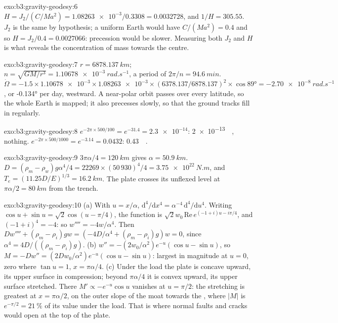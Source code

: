 \begin{solution}{exo:b3:gravity-geodesy:6}
$H = J_2/(C/Ma^2) = \num{1.08263e-3}/0.3308 = \num{0.0032728}$, and
$1/H = 305.55$. $J_2$ is the same by hypothesis; a uniform Earth would have
$C/(Ma^2) = 0.4$ and so $H = J_2/0.4 = \num{0.0027066}$: precession would be
slower. Measuring both $J_2$ and $H$ is what reveals the concentration of mass
towards the centre.
\end{solution}

\begin{solution}{exo:b3:gravity-geodesy:7}
$r = \qty{6878.137}{km}$; $n = \sqrt{GM/r^3} = \qty{1.10678e-3}{rad.s^{-1}}$, a
period of $2\pi/n = \qty{94.6}{min}$. $\dot\Omega = -1.5\times\num{1.10678e-3}
\times\num{1.08263e-3}\times(6378.137/6878.137)^2\times\cos\ang{89} =
\qty{-2.70e-8}{rad.s^{-1}}$, or \ang{-0.134} per day, westward. A near-polar orbit
passes over every latitude, so the whole Earth is mapped; it also precesses
slowly, so that the ground tracks fill in regularly.
\end{solution}

\begin{solution}{exo:b3:gravity-geodesy:8}
$e^{-2\pi\times500/100} = e^{-31.4} = \num{2.3e-14}$: \qty{2e-13}{\milli\gal},
nothing. $e^{-2\pi\times500/1000} = e^{-3.14} = 0.0432$:
\qty{0.43}{\milli\gal}.
\end{solution}

\begin{solution}{exo:b3:gravity-geodesy:9}
$3\pi\alpha/4 = \qty{120}{km}$ gives $\alpha = \qty{50.9}{km}$.
$D = (\rho_m - \rho_w)g\alpha^4/4 = 22269\times(50\,930)^4/4 =
\qty{3.75e22}{N.m}$, and $T_e = (11.25D/E)^{1/3} = \qty{16.2}{km}$. The plate
crosses its unflexed level at $\pi\alpha/2 = \qty{80}{km}$ from the trench.
\end{solution}

\begin{solution}{exo:b3:gravity-geodesy:10}
(a) With $u = x/\alpha$, $\mathrm d^4/\mathrm dx^4 = \alpha^{-4}\,\mathrm
d^4/\mathrm du^4$. Writing $\cos u + \sin u = \sqrt2\cos(u - \pi/4)$, the
function is $\sqrt2w_0\,\mathrm{Re}\,e^{(-1 + i)u - i\pi/4}$, and
$(-1 + i)^4 = -4$: so $w'''' = -4w/\alpha^4$. Then $Dw'''' + (\rho_m -
\rho_i)gw = (-4D/\alpha^4 + (\rho_m - \rho_i)g)w = 0$, since $\alpha^4 =
4D/((\rho_m - \rho_i)g)$. (b) $w'' = -(2w_0/\alpha^2)e^{-u}(\cos u - \sin u)$, so
$M = -Dw'' = (2Dw_0/\alpha^2)e^{-u}(\cos u - \sin u)$: largest in magnitude at
$u = 0$, zero where $\tan u = 1$, $x = \pi\alpha/4$. (c) Under the load the
plate is concave upward, its upper surface in compression; beyond $\pi\alpha/4$
it is convex upward, its upper surface stretched. There $M' \propto
-e^{-u}\cos u$ vanishes at $u = \pi/2$: the stretching is greatest at
$x = \pi\alpha/2$, on the outer slope of the moat towards the , where
$|M|$ is $e^{-\pi/2} = \qty{21}{\percent}$ of its value under the load. That is
where normal faults and cracks would open at the top of the plate.
\end{solution}

